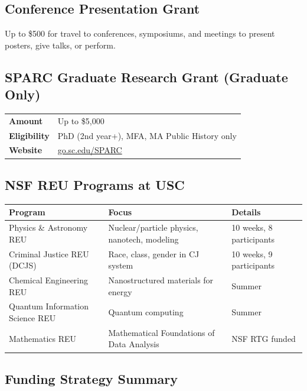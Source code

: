 \documentclass[11pt, letterpaper]{article}
\begin{document}
\subsection{Conference Presentation Grant}

Up to \$500 for travel to conferences, symposiums, and meetings to present posters, give talks, or perform.

\subsection{SPARC Graduate Research Grant (Graduate Only)}

\begin{tabularx}{\textwidth}{@{}>{\bfseries}l X@{}}
\toprule
Amount & Up to \$5,000 \\
Eligibility & PhD (2nd year+), MFA, MA Public History only \\
Website & \href{https://sc.edu/about/offices_and_divisions/research_and_grant_development/funding/internal_funding/sparc/}{go.sc.edu/SPARC} \\
\bottomrule
\end{tabularx}

\subsection{NSF REU Programs at USC}

\begin{longtable}{@{}p{5cm} p{5cm} p{4cm}@{}}
\toprule
\textbf{Program} & \textbf{Focus} & \textbf{Details} \\
\midrule
\endhead
Physics \& Astronomy REU & Nuclear/particle physics, nanotech, modeling & 10 weeks, 8 participants \\
Criminal Justice REU (DCJS) & Race, class, gender in CJ system & 10 weeks, 9 participants \\
Chemical Engineering REU & Nanostructured materials for energy & Summer \\
Quantum Information Science REU & Quantum computing & Summer \\
Mathematics REU & Mathematical Foundations of Data Analysis & NSF RTG funded \\
\bottomrule
\end{longtable}

\subsection{Funding Strategy Summary}
\end{document}
